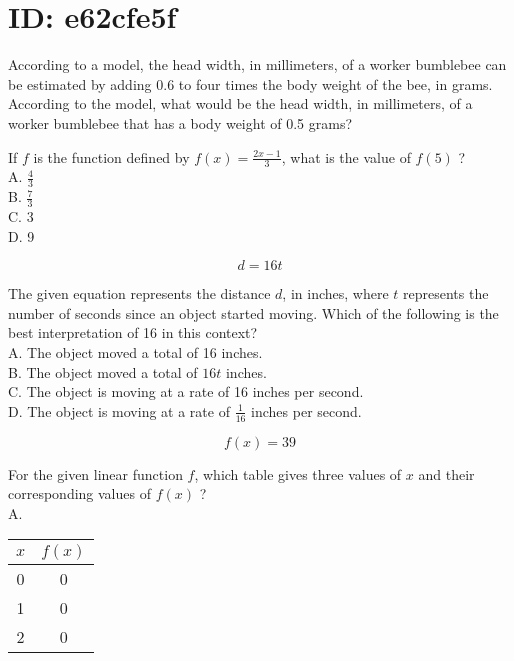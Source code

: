 \section*{ID: e62cfe5f}
According to a model, the head width, in millimeters, of a worker 
bumblebee can be estimated by adding 0.6 to four times the body 
weight of the bee, in grams. According to the model, what would be 
the head width, in millimeters, of a worker bumblebee that has a 
body weight of 0.5 grams?








If $f$ is the function defined by $f(x)=\frac{2 x-1}{3}$, what is the value of $f(5)$ ?\\
A. $\frac{4}{3}$\\
B. $\frac{7}{3}$\\
C. 3\\
D. 9











$$
d=16 t
$$

The given equation represents the distance $d$, in inches, where $t$ represents the number of seconds since an object started moving. Which of the following is the best interpretation of 16 in this context?\\
A. The object moved a total of 16 inches.\\
B. The object moved a total of $16 t$ inches.\\
C. The object is moving at a rate of 16 inches per second.\\
D. The object is moving at a rate of $\frac{1}{16}$ inches per second.












$$
f(x)=39
$$

For the given linear function $f$, which table gives three values of $x$ and their corresponding values of $f(x)$ ?\\
A.

\begin{center}
\begin{tabular}{|c|c|}
\hline
$x$ & $f(x)$ \\
\hline
0 & 0 \\
\hline
1 & 0 \\
\hline
2 & 0 \\
\hline
\end{tabular}
\end{center}

